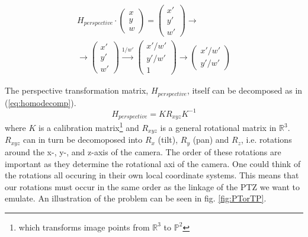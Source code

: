 	\begin{multline}
		H_{perspective}\cdot
		\begin{pmatrix}
			x \\
			y \\
			w
		\end{pmatrix}=
		\begin{pmatrix}
			x' \\
			y' \\
			w'
		\end{pmatrix} \rightarrow \\
		\rightarrow
		\begin{pmatrix}
			x' \\
			y' \\
			w'
		\end{pmatrix} \xrightarrow{1/w'}
		\begin{pmatrix}
			x'/w' \\
			y'/w' \\
			1
		\end{pmatrix} \rightarrow
		\begin{pmatrix}
			x'/w' \\
			y'/w'
		\end{pmatrix}
		\label{eq:homoapp}
	\end{multline}

	The perspective transformation matrix, $H_{perspective}$, itself can be decomposed as in (\ref{eq:homodecomp}).
	\begin{equation}
		H_{perspective}=KR_{xyz}K^{-1}
		\label{eq:homodecomp}
	\end{equation}
	where $K$ is a calibration matrix\footnote{which transforms image points from $\mathbb{R}^3$ to $\mathbb{P}^2$} and $R_{xyz}$ is a general rotational matrix in $\mathbb{R}^3$.
$R_{xyz}$ can in turn be decomoposed into $R_x$ (tilt), $R_y$ (pan) and $R_z$, i.e. rotations around the x-, y-, and z-axis of the camera.
The order of these rotations are important as they determine the rotational axi of the camera.
One could think of the rotations all occuring in their own local coordinate systems.
This means that our rotations must occur in the same order as the linkage of the PTZ we want to emulate.
An illustration of the problem can be seen in fig. \ref{fig:PTorTP}.

